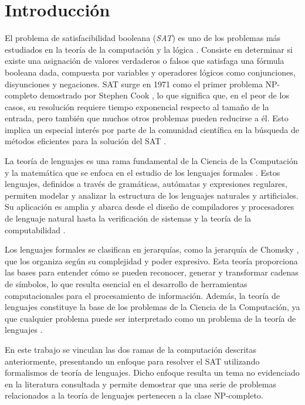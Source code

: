 \chapter*{Introducción}

El problema de satisfacibilidad booleana (\textit{SAT}) \cite{authomataTheory} es uno de los problemas más estudiados en 
la teoría de la computación y la lógica \cite{biere2021handbook}.  Consiste en determinar si existe una asignación 
de valores verdaderos o falsos que satisfaga una fórmula booleana dada, compuesta por variables y operadores 
lógicos como conjunciones, disyunciones y negaciones. SAT surge en 1971 como el primer problema NP-completo 
demostrado por Stephen Cook \cite{Cook1971}, lo que significa que, en el peor de los casos, su resolución 
requiere tiempo exponencial respecto al tamaño de la entrada, pero también que muchos otros problemas pueden 
reducirse a él. Esto implica un especial interés por parte de la comunidad científica en la búsqueda de 
métodos eficientes para la solución del SAT \cite{biere2021handbook}.

La teoría de lenguajes es una rama fundamental de la Ciencia de la Computación y la matemática que se enfoca 
en el estudio de los lenguajes formales \cite{authomataTheory}. Estos lenguajes, definidos a través de 
gramáticas, autómatas y expresiones regulares, permiten modelar y analizar la estructura de los lenguajes 
naturales y artificiales. Su aplicación es amplia y abarca desde el diseño de compiladores y procesadores de 
lenguaje natural hasta la verificación de sistemas y la teoría de la computabilidad \cite{authomataTheory}.

Los lenguajes formales se clasifican en jerarquías, como la jerarquía de Chomsky \cite{hunter2020chomsky}, 
que los organiza según su complejidad y poder expresivo. Esta teoría proporciona las bases para 
entender cómo se pueden reconocer, generar y transformar cadenas de símbolos, lo que resulta esencial 
en el desarrollo de herramientas computacionales para el procesamiento de información. Además, 
la teoría de lenguajes constituye la base de los problemas de la Ciencia de la Computación, ya que 
cualquier problema puede ser interpretado como un problema de la teoría de lenguajes \cite{authomataTheory}.

En este trabajo se vinculan las dos ramas de la computación descritas anteriormente, presentando 
un enfoque para resolver el SAT utilizando formalismos de teoría de lenguajes. Dicho enfoque resulta un 
tema no evidenciado en la literatura consultada y permite demostrar que una serie de problemas 
relacionados a la teoría de lenguajes pertenecen a la clase NP-completo.

